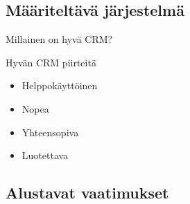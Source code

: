 \documentclass{beamer}
\begin{document}
\subsection{Määriteltävä järjestelmä}

\begin{frame}{Millainen on hyvä CRM?}

Hyvän CRM piirteitä

	\begin{itemize}
		\item<2-> Helppokäyttöinen
		\item<3-> Nopea
		\item<4-> Yhteensopiva
		\item<5-> Luotettava
	\end{itemize}
\end{frame}

\subsection{Alustavat vaatimukset}
\end{document}
